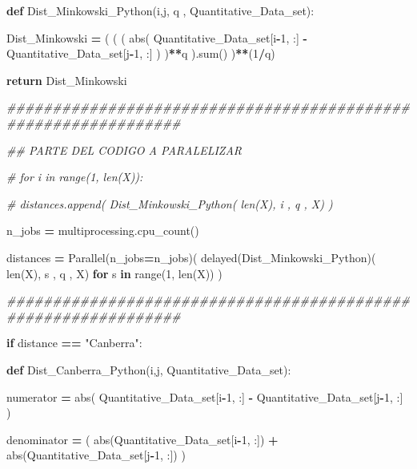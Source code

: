 \documentclass[
  11pt,
  a4paper,
]{article}
\newenvironment{Shaded}{\begin{snugshade}}{\end{snugshade}}
\newcommand{\BuiltInTok}[1]{#1}
\newcommand{\CommentTok}[1]{\textcolor[rgb]{0.56,0.35,0.01}{\textit{#1}}}
\newcommand{\ControlFlowTok}[1]{\textcolor[rgb]{0.13,0.29,0.53}{\textbf{#1}}}
\newcommand{\DecValTok}[1]{\textcolor[rgb]{0.00,0.00,0.81}{#1}}
\newcommand{\KeywordTok}[1]{\textcolor[rgb]{0.13,0.29,0.53}{\textbf{#1}}}
\newcommand{\NormalTok}[1]{#1}
\newcommand{\OperatorTok}[1]{\textcolor[rgb]{0.81,0.36,0.00}{\textbf{#1}}}
\newcommand{\StringTok}[1]{\textcolor[rgb]{0.31,0.60,0.02}{#1}}
\begin{document}
\begin{Shaded}
\begin{Highlighting}[]
        \KeywordTok{def}\NormalTok{ Dist\_Minkowski\_Python(i,j, q , Quantitative\_Data\_set):}

\NormalTok{            Dist\_Minkowski }\OperatorTok{=}\NormalTok{ ( ( ( }\BuiltInTok{abs}\NormalTok{( Quantitative\_Data\_set[i}\OperatorTok{{-}}\DecValTok{1}\NormalTok{, :] }\OperatorTok{{-}}\NormalTok{ Quantitative\_Data\_set[j}\OperatorTok{{-}}\DecValTok{1}\NormalTok{, :] ) )}\OperatorTok{**}\NormalTok{q ).}\BuiltInTok{sum}\NormalTok{() )}\OperatorTok{**}\NormalTok{(}\DecValTok{1}\OperatorTok{/}\NormalTok{q)}

            \ControlFlowTok{return}\NormalTok{ Dist\_Minkowski}

\CommentTok{\#\#\#\#\#\#\#\#\#\#\#\#\#\#\#\#\#\#\#\#\#\#\#\#\#\#\#\#\#\#\#\#\#\#\#\#\#\#\#\#\#\#\#\#\#\#\#\#\#\#\#\#\#\#\#\#\#\#\#\#\#\#\#}

        \CommentTok{\#\# PARTE DEL CODIGO A PARALELIZAR}

        \CommentTok{\# for i in range(1, len(X)):}

          \CommentTok{\#  distances.append( Dist\_Minkowski\_Python( len(X), i , q , X) )}

\NormalTok{        n\_jobs  }\OperatorTok{=}\NormalTok{ multiprocessing.cpu\_count()}

\NormalTok{        distances }\OperatorTok{=}\NormalTok{ Parallel(n\_jobs}\OperatorTok{=}\NormalTok{n\_jobs)( delayed(Dist\_Minkowski\_Python)( }\BuiltInTok{len}\NormalTok{(X), s , q , X) }\ControlFlowTok{for}\NormalTok{ s }\KeywordTok{in} \BuiltInTok{range}\NormalTok{(}\DecValTok{1}\NormalTok{, }\BuiltInTok{len}\NormalTok{(X)) )}

\CommentTok{\#\#\#\#\#\#\#\#\#\#\#\#\#\#\#\#\#\#\#\#\#\#\#\#\#\#\#\#\#\#\#\#\#\#\#\#\#\#\#\#\#\#\#\#\#\#\#\#\#\#\#\#\#\#\#\#\#\#\#\#\#\#\#}

    \ControlFlowTok{if}\NormalTok{ distance }\OperatorTok{==} \StringTok{"Canberra"}\NormalTok{:}

        \KeywordTok{def}\NormalTok{ Dist\_Canberra\_Python(i,j, Quantitative\_Data\_set):}

\NormalTok{            numerator }\OperatorTok{=}  \BuiltInTok{abs}\NormalTok{( Quantitative\_Data\_set[i}\OperatorTok{{-}}\DecValTok{1}\NormalTok{, :] }\OperatorTok{{-}}\NormalTok{ Quantitative\_Data\_set[j}\OperatorTok{{-}}\DecValTok{1}\NormalTok{, :] )  }

\NormalTok{            denominator }\OperatorTok{=}\NormalTok{  ( }\BuiltInTok{abs}\NormalTok{(Quantitative\_Data\_set[i}\OperatorTok{{-}}\DecValTok{1}\NormalTok{, :]) }\OperatorTok{+} \BuiltInTok{abs}\NormalTok{(Quantitative\_Data\_set[j}\OperatorTok{{-}}\DecValTok{1}\NormalTok{, :]) )}
       

\end{Highlighting}
\end{Shaded}
\end{document}

